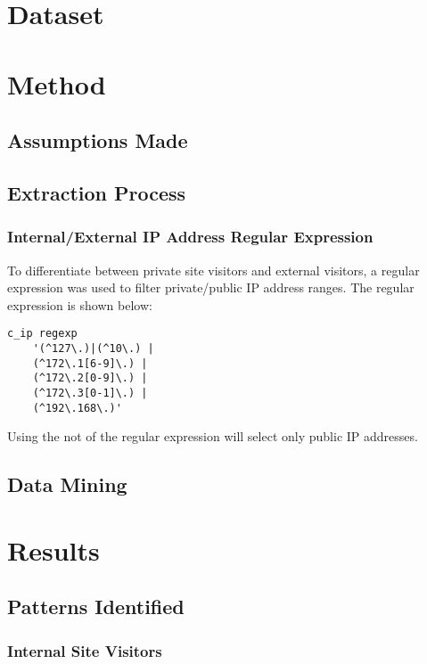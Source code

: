 \documentclass[12pt,titlepage]{article}
\begin{document}
\section{Dataset}

\section{Method}

\subsection{Assumptions Made}

\subsection{Extraction Process}

\subsubsection{Internal/External IP Address Regular Expression}

To differentiate between private site visitors and external visitors, a regular expression was used to filter private/public IP address ranges. The regular expression is shown below:

\begin{lstlisting}
c_ip regexp 
	'(^127\.)|(^10\.) | 
	(^172\.1[6-9]\.) |
	(^172\.2[0-9]\.) |
	(^172\.3[0-1]\.) |
	(^192\.168\.)'
\end{lstlisting}

Using the not of the regular expression will select only public IP addresses.

\subsection{Data Mining}

\section{Results}

\subsection{Patterns Identified}

\subsubsection{Internal Site Visitors}
\end{document}
